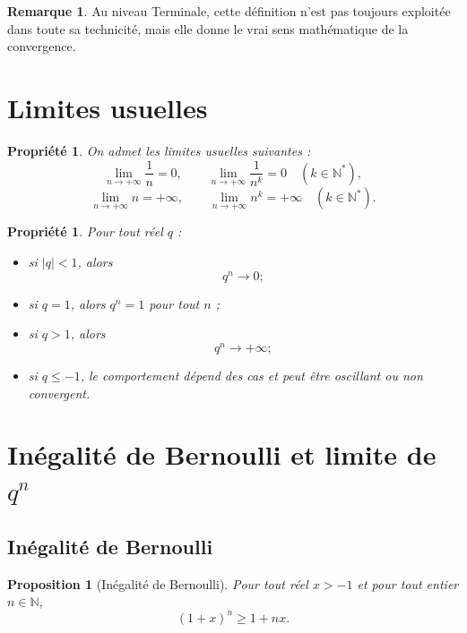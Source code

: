 \documentclass[11pt,a4paper]{article}
\theoremstyle{definition}
\newtheorem{remarque}[definition]{Remarque}
\theoremstyle{plain}
\newtheorem{propriete}[definition]{Propriété}
\newtheorem{proposition}[definition]{Proposition}
\theoremstyle{remark}
\newcommand{\N}{\mathbb{N}}
\begin{document}
\begin{remarque}
Au niveau Terminale, cette définition n'est pas toujours exploitée dans toute sa technicité, mais elle donne le vrai sens mathématique de la convergence.
\end{remarque}

\section{Limites usuelles}

\begin{propriete}
On admet les limites usuelles suivantes :
\[
\lim_{n\to+\infty}\frac1n=0,
\qquad
\lim_{n\to+\infty}\frac1{n^k}=0\quad (k\in\N^*),
\]
\[
\lim_{n\to+\infty}n=+\infty,
\qquad
\lim_{n\to+\infty}n^k=+\infty\quad (k\in\N^*).
\]
\end{propriete}

\begin{propriete}
Pour tout réel $q$ :
\begin{itemize}[leftmargin=0.8cm]
    \item si $|q|<1$, alors
    \[
    q^n\to0;
    \]
    \item si $q=1$, alors $q^n=1$ pour tout $n$ ;
    \item si $q>1$, alors
    \[
    q^n\to+\infty;
    \]
    \item si $q\leq -1$, le comportement dépend des cas et peut être oscillant ou non convergent.
\end{itemize}
\end{propriete}

\section{Inégalité de Bernoulli et limite de \(q^n\)}

\subsection{Inégalité de Bernoulli}

\begin{proposition}[Inégalité de Bernoulli]
Pour tout réel $x>-1$ et pour tout entier $n\in\N$,
\[
(1+x)^n\geq 1+nx.
\]
\end{proposition}
\end{document}
